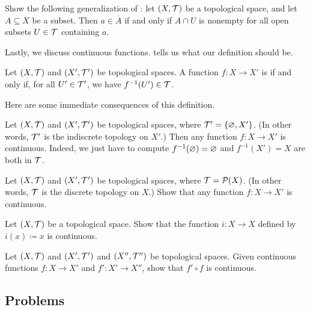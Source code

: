 \documentclass[../main.tex]{subfiles}
\begin{document}
\begin{exe}
    Show the following generalization of : let $(X,\mathcal{T})$ be a topological space, and let $A\subseteq X$ be a subset. Then $a\in\overline A$ if and only if $A\cap U$ is nonempty for all open subsets $U\in\mathcal{T}$ containing $a$.
\end{exe}
Lastly, we discuss continuous functions.  tells us what our definition should be.
\begin{definition}[continuous]
    Let $(X,\mathcal{T})$ and $(X',\mathcal{T}')$ be topological spaces. A function $f\colon X\to X'$ is  if and only if, for all $U'\in\mathcal{T}'$, we have $f^{-1}(U')\in\mathcal{T}$.
\end{definition}
Here are some immediate consequences of this definition.
\begin{example}
    Let $(X,\mathcal{T})$ and $(X',\mathcal{T}')$ be topological spaces, where $\mathcal{T}'=\{\varnothing,X'\}$. (In other words, $\mathcal{T}'$ is the indiscrete topology on $X'$.) Then any function $f\colon X\to X'$ is continuous. Indeed, we just have to compute $f^{-1}(\varnothing)=\varnothing$ and $f^{-1}(X')=X$ are both in $\mathcal{T}$.
\end{example}
\begin{exe}
    Let $(X,\mathcal{T})$ and $(X',\mathcal{T}')$ be topological spaces, where $\mathcal{T}=\mathcal{P}(X)$. (In other words, $\mathcal{T}$ is the discrete topology on $X$.) Show that any function $f\colon X\to X'$ is continuous.
\end{exe}
\begin{exe}
    Let $(X,\mathcal{T})$ be a topological space. Show that the function $i\colon X\to X$ defined by $i(x)\coloneqq x$ is continuous.
\end{exe}
\begin{exe}
    Let $(X,\mathcal{T})$ and $(X',\mathcal{T}')$ and $(X'',\mathcal{T}'')$ be topological spaces. Given continuous functions $f\colon X\to X'$ and $f'\colon X'\to X''$, show that $f'\circ f$ is continuous.
\end{exe}

\subsection{Problems}
\end{document}
